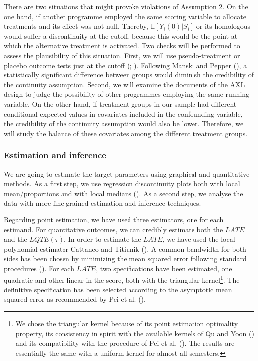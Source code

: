 \documentclass[
  11pt]{article}
\begin{document}
There are two situations that might provoke violations of Assumption 2.
On the one hand, if another programme employed the same scoring variable
to allocate treatments and its effect was not null. Thereby,
\(\mathbb{E}[Y_i(0)|S_i]\) or its homologous would suffer a
discontinuity at the cutoff, because this would be the point at which
the alternative treatment is activated. Two checks will be performed to
assess the plausibility of this situation. First, we will use
pseudo-treatment or placebo outcome tests just at the cutoff
(;
). Following Manski and
Pepper (), a statistically
significant difference between groups would diminish the credibility of
the continuity assumption. Second, we will examine the documents of the
AXL design to judge the possibility of other programmes employing the
same running variable. On the other hand, if treatment groups in our
sample had different conditional expected values in covariates included
in the confounding variable, the credibility of the continuity
assumption would also be lower. Therefore, we will study the balance of
these covariates among the different treatment groups.

\subsubsection{Estimation and inference}\label{estimation-and-inference}

We are going to estimate the target parameters using graphical and
quantitative methods. As a first step, we use regression discontinuity
plots both with local mean/proportions and with local medians
(). As a second
step, we analyse the data with more fine-grained estimation and
inference techniques.

Regarding point estimation, we have used three estimators, one for each
estimand. For quantitative outcomes, we can credibly estimate both the
\(LATE\) and the \(LQTE(\tau)\). In order to estimate the \(LATE\), we
have used the local polynomial estimator Cattaneo and Titiunik
(). A common bandwidth for both
sides has been chosen by minimizing the mean squared error following
standard procedures (). For each \(LATE\), two specifications have been estimated, one
quadratic and other linear in the score, both with the triangular
kernel\footnote{We chose the triangular kernel because of its point
  estimation optimality property, its consistency in spirit with the
  available kernels of Qu and Yoon () and
  its compatibility with the procedure of Pei et al.
  (). The results are essentially the
  same with a uniform kernel for almost all semesters.}. The definitive
specification has been selected according to the asymptotic mean squared
error as recommended by Pei et al. ().
\end{document}
